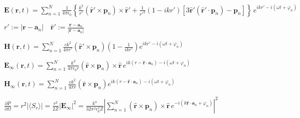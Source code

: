 \documentclass[multi={mymath},border=1pt,convert={density=300,outext=.png}]{standalone}
\newenvironment{mymath}{$\displaystyle}{$}
\begin{document}
\pagecolor[RGB]{255,255,255} %

\newcommand{\norm}[1]{\left|#1\right|}

\begin{mymath}
\mathbf{E}(\mathbf{r}, t) = \sum_{n=1}^{N}\frac{1}{4\pi\epsilon_{0}}\left\{ \frac{k^{2}}{r'}(\mathbf{\hat{r}'} \times \mathbf{p}_{n}) \times \mathbf{\hat{r}'} + \frac{1}{r'^{3}}(1-ikr')\left[3\mathbf{\hat{r}'}(\mathbf{\hat{r}'}\cdot\mathbf{p}_{n}) - \mathbf{p}_{n}\right]\right\}\,e^{ikr' - i(\omega t + \varphi_{n})}
\end{mymath}

\begin{mymath}
r' := |\mathbf{r} - \mathbf{a}_{n}|\quad\mathbf{\hat{r}'} := \frac{\mathbf{r} - \mathbf{a}_{n}}{|\mathbf{r} - \mathbf{a}_{n}|}
\end{mymath}

\begin{mymath}
\mathbf{H}(\mathbf{r}, t) = \sum_{n=1}^{N}\frac{ck^2}{4\pi r'} (\mathbf{\hat{r}'} \times \mathbf{p}_{n}) \left (1 - \frac{1}{ikr'}\right) e^{ikr' - i(\omega t + \varphi_{n})}
\end{mymath}


\begin{mymath}
\mathbf{E}_{\infty}(\mathbf{r}, t) = \sum_{n=1}^{N}\frac{k^{2}}{4\pi\epsilon_{0}r} (\mathbf{\hat{r}} \times \mathbf{p}_{n}) \times \mathbf{\hat{r}}\,e^{ik(r - \mathbf{\hat{r}}\cdot\mathbf{a}_{n}) - i(\omega t + \varphi_{n})}
\end{mymath}

\begin{mymath}
\mathbf{H}_\infty(\mathbf{r}, t) = \sum_{n=1}^{N}\frac{ck^2}{4\pi r} (\mathbf{\hat{r}} \times \mathbf{p}_{n}) e^{ik(r - \mathbf{\hat{r}}\cdot\mathbf{a}_n) - i(\omega t + \varphi_{n})}
\end{mymath}


\begin{mymath}
  \frac{\partial \overline{P}}{\partial \Omega} = r^{2} |\langle S_{r} \rangle| = \frac{r^{2}}{2Z} \norm{\mathbf{E}_{\infty}}^{2} = \frac{k^{4}}{32\pi^{2}\epsilon_{0}^{2}Z} \norm{\sum_{n=1}^{N} (\mathbf{\hat{r}} \times \mathbf{p}_{n}) \times \mathbf{\hat{r}}\, e^{- i(k\mathbf{\hat{r}}\cdot\mathbf{a}_{n} + \varphi_{n})}}^{2}
\end{mymath}
\end{document}

